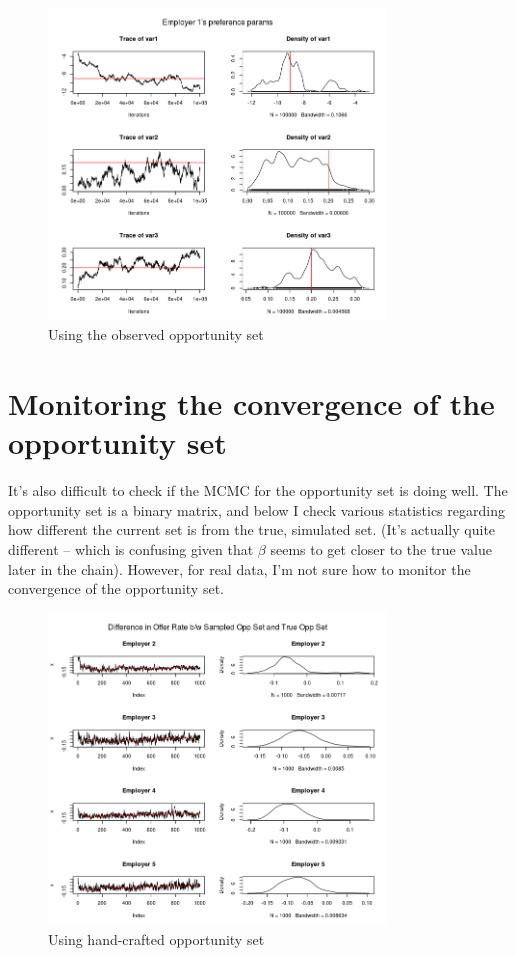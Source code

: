 \documentclass[12pt]{article}
\begin{document}
\begin{figure}[!ht]
\centering
\includegraphics[width=0.8\textwidth]{../figure/employer1_beta_obs_opp}
\caption{Using the observed opportunity set}
\end{figure}

\FloatBarrier
\section{Monitoring the convergence of the opportunity set}

It's also difficult to check if the MCMC for the opportunity set is doing well.
The opportunity set is a binary matrix, and below I check various statistics
regarding how different the current set is from the true, simulated set. (It's
actually quite different -- which is confusing given that $\beta$ seems to get
closer to the true value later in the chain).
However, for real data, I'm not sure how to monitor the convergence of the
opportunity set.

\begin{figure}[!ht]
\centering
\includegraphics[width=0.8\textwidth]{../figure/diff_offer_rate_opp_starting_opp}
\caption{Using hand-crafted opportunity set}
\end{figure}
\end{document}
